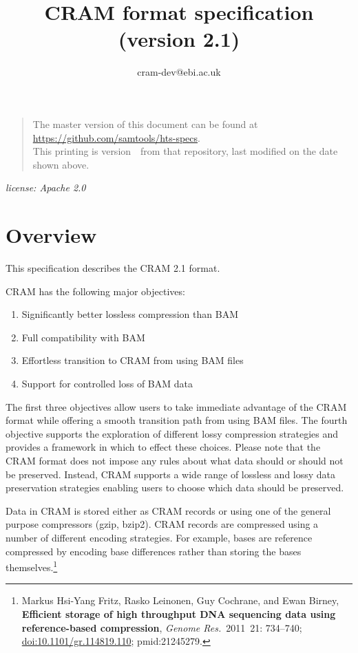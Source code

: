 \documentclass[a4paper]{article}
\begin{document}

\title{CRAM format specification (version 2.1)}
\author{cram-dev@ebi.ac.uk}
\date{\headdate}
\maketitle

\begin{quote}\small
The master version of this document can be found at
\url{https://github.com/samtools/hts-specs}.\\
This printing is version~\commitdesc\ from that repository,
last modified on the date shown above.
\end{quote}

\begin{center}
\textit{license: Apache 2.0}
\end{center}
\vspace*{1em}

\section{\textbf{Overview}}

This specification describes the CRAM 2.1 format. 

CRAM has the following major objectives:

\begin{enumerate}
\item Significantly better lossless compression than BAM

\item Full compatibility with BAM

\item Effortless transition to CRAM from using BAM files

\item Support for controlled loss of BAM data
\end{enumerate}

The first three objectives allow users to take immediate advantage of the CRAM 
format while offering a smooth transition path from using BAM files. The fourth 
objective supports the exploration of different lossy compression strategies and 
provides a framework in which to effect these choices. Please note that the CRAM 
format does not impose any rules about what data should or should not be preserved. 
Instead, CRAM supports a wide range of lossless and lossy data preservation strategies 
enabling users to choose which data should be preserved.

Data in CRAM is stored either as CRAM records or using one of the general purpose 
compressors (gzip, bzip2). CRAM records are compressed using a number of different 
encoding strategies. For example, bases are reference compressed by encoding base
differences rather than storing the bases themselves.\footnote{Markus Hsi-Yang Fritz,
Rasko Leinonen, Guy Cochrane, and Ewan Birney,
\textbf{Efficient storage of high throughput DNA sequencing data using reference-based compression},
{\sl Genome Res.}~2011~21: 734--740;
\href{http://dx.doi.org/doi:10.1101/gr.114819.110}{doi:10.1101/gr.114819.110};
{\sc pmid:}21245279.}
\end{document}
